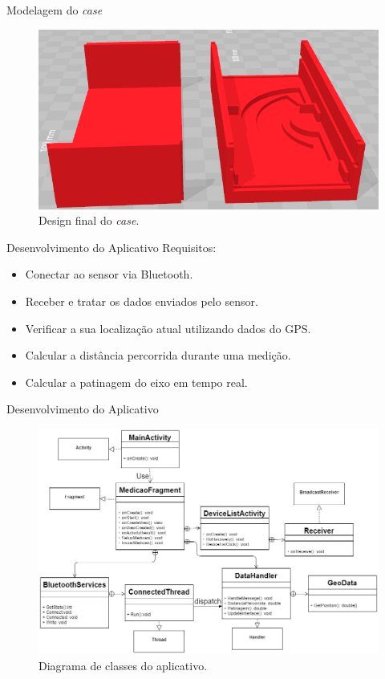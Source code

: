 \documentclass[12pt]{beamer}
\begin{document}
\begin{frame}{Modelagem do \textit{case}}
    \begin{figure}[H]
    \centering
    \includegraphics[width=\textwidth]{casefinal.png}
    \caption{Design final do \textit{case}.}
    \label{fig:caseAtual}
    \end{figure}
\end{frame}

\begin{frame}{Desenvolvimento do Aplicativo}
    Requisitos:
    \begin{itemize}
    \item Conectar ao sensor via Bluetooth.
    \item Receber e tratar os dados enviados pelo sensor.
    \item Verificar a sua localização atual utilizando dados do GPS.
    \item Calcular a distância percorrida durante uma medição.
    \item Calcular a patinagem do eixo em tempo real.
    \end{itemize}
\end{frame}

\begin{frame}{Desenvolvimento do Aplicativo}
    
\begin{figure}[H]
\centering
\includegraphics[width=\textwidth]{DiagramaClasses.jpg}
\caption{Diagrama de classes do aplicativo.}
\label{fig:classes}
\end{figure}
\end{frame}
\end{document}
